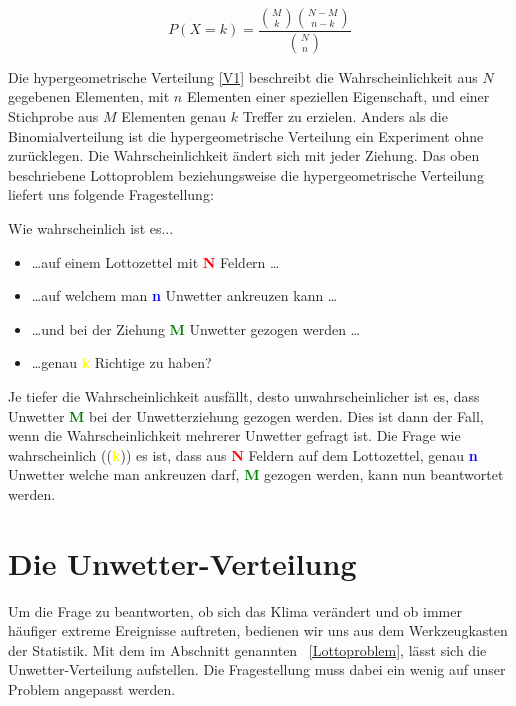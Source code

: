 \begin{refsection}
\begin{equation}
P(X = k) = 
\frac{\displaystyle \binom{M}{k} \binom{N-M}{n-k}}{\displaystyle \binom{N}{n} } 
\label {V1}
\end{equation}

Die hypergeometrische Verteilung \eqref{V1} beschreibt die Wahrscheinlichkeit aus $N$ gegebenen Elementen, mit $n$ Elementen einer speziellen Eigenschaft, und einer Stichprobe aus $M$ Elementen genau $k$ Treffer zu erzielen. 
Anders als die Binomialverteilung ist die hypergeometrische Verteilung ein Experiment ohne zurücklegen. Die Wahrscheinlichkeit ändert sich mit jeder Ziehung. 
%
Das oben beschriebene Lottoproblem beziehungsweise die hypergeometrische Verteilung liefert uns folgende Fragestellung:

Wie wahrscheinlich ist es...

\begin{itemize}
\item \dots auf einem Lottozettel mit \textcolor{red}{\textbf{N}} Feldern \dots
\item \dots auf welchem man \textcolor{blue}{\textbf{n}} Unwetter ankreuzen kann \dots
\item \dots und bei der Ziehung \textcolor{green}{\textbf{M}} Unwetter gezogen werden \dots
\item \dots genau \textcolor{yellow}{\textbf{k}} Richtige zu haben?
\end{itemize}

Je tiefer die Wahrscheinlichkeit ausfällt, desto unwahrscheinlicher ist es, dass Unwetter \textcolor{green}{\textbf{M}} bei der Unwetterziehung gezogen werden. Dies ist dann der Fall, wenn die Wahrscheinlichkeit mehrerer Unwetter gefragt ist. Die Frage wie wahrscheinlich ((\textcolor{yellow}{\textbf{k}})) es ist, dass aus \textcolor{red}{\textbf{N}} Feldern auf dem Lottozettel, genau \textcolor{blue}{\textbf{n}} Unwetter welche man ankreuzen darf, \textcolor{green}{\textbf{M}} gezogen werden, kann nun beantwortet werden.


\section{Die Unwetter-Verteilung} \label{UnwetterVert}
Um die Frage zu beantworten, ob sich das Klima verändert und ob immer häufiger extreme Ereignisse auftreten, bedienen wir uns aus dem Werkzeugkasten der Statistik. Mit dem im Abschnitt genannten ~\ref{Lottoproblem}, lässt sich die Unwetter-Verteilung aufstellen. Die Fragestellung muss dabei ein wenig auf unser Problem angepasst werden.


\end{refsection}
